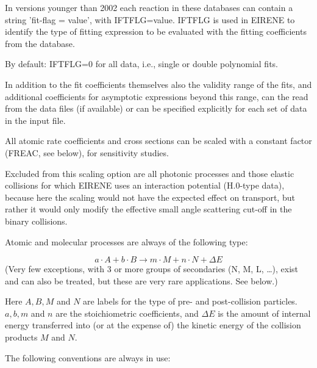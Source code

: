 In versions younger than 2002 each reaction in these databases can contain a
string 'fit-flag = value', with IFTFLG=value.
IFTFLG is used in EIRENE to identify the type of fitting expression to be
evaluated with the fitting coefficients from the database.

By default: IFTFLG=0 for all data, i.e., single or double polynomial fits.

In addition to the fit coefficients themselves also the validity range of the
fits, and additional coefficients for asymptotic expressions beyond this range,
can the read from the data files (if available) or can be specified explicitly
for each set of data in the input file.

All atomic rate coefficients and cross sections can be scaled with a constant
factor (FREAC, see below), for sensitivity studies.

Excluded from this scaling option are all photonic processes and those elastic
collisions for which EIRENE uses an interaction potential (H.0-type data),
because here the scaling would not have the expected effect on transport, but
rather it would only modify the effective small angle scattering cut-off in the
binary collisions.

Atomic and molecular processes are always of the following type:

\begin{displaymath}
  a \cdot A + b \cdot B \longrightarrow m \cdot M + n \cdot N + \Delta E
\end{displaymath}
(Very few exceptions, with 3 or more groups of secondaries (N, M, L, \dots),
exist and can also be treated, but these are very rare applications.
See below.)

Here $A,B,M$ and $N$ are labels for the type of pre- and post-collision
particles.
$a,b,m$ and $n$ are the stoichiometric coefficients, and $\Delta E$ is the
amount of internal energy transferred into (or at the expense of) the kinetic
energy of the collision products $M$ and $N$.

The following conventions are always in use:

